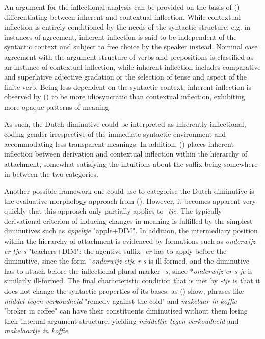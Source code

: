 An argument for the inflectional analysis can be provided on the basis of \citeauthor{Booij+2000} (\citeyear{Booij+2000}) differentiating between inherent and contextual inflection. While contextual inflection is entirely conditioned by the needs of the syntactic structure, e.g. in instances of agreement, inherent inflection is said to be independent of the syntactic context and subject to free choice by the speaker instead. Nominal case agreement with the argument structure of verbs and prepositions is classified as an instance of contextual inflection, while inherent inflection includes comparative and superlative adjective gradation or the selection of tense and aspect of the finite verb. Being less dependent on the syntactic context, inherent inflection is observed by \citeauthor{Booij+2000} (\citeyear{Booij+2000}) to be more idiosyncratic than contextual inflection, exhibiting more opaque patterns of meaning.

As such, the Dutch diminutive could be interpreted as inherently inflectional, coding gender irrespective of the immediate syntactic environment and accommodating less transparent meanings. In addition, \citeauthor{Booij+2000} (\citeyear{Booij+2000}) places inherent inflection between derivation and contextual inflection within the hierarchy of attachment, somewhat satisfying the intuitions about the suffix being somewhere in between the two categories.

Another possible framework one could use to categorise the Dutch diminutive is the evaluative morphology approach from \citeauthor{Scalise+1986} (\citeyear{Scalise+1986}). However, it becomes apparent very quickly that this approach only partially applies to \textit{-tje}. The typically derivational criterion of inducing changes in meaning is fulfilled by the simplest diminutives such as \textit{appeltje} "apple+DIM". In addition, the intermediary position within the hierarchy of attachment is evidenced by formations such as \textit{onderwijz-er-tje-s} "teachers+DIM": the agentive suffix \textit{-er} has to apply before the diminutive, since the form *\textit{onderwijz-etje-r-s} is ill-formed, and the diminutive has to attach before the inflectional plural marker \textit{-s}, since *\textit{onderwijz-er-s-je} is similarly ill-formed. The final characteristic condition that is met by \textit{-tje} is that it does not change the syntactic properties of its bases: as \citeauthor{taalportaal} (\citeyear{taalportaal}) show, phrases like \textit{middel tegen verkoudheid} "remedy against the cold" and \textit{makelaar in koffie} "broker in coffee" can have their constituents diminutised without them losing their internal argument structure, yielding \textit{middeltje tegen verkoudheid} and \textit{makelaartje in koffie}.

